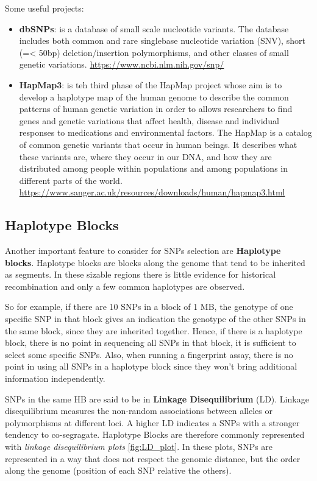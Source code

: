 \bigskip
Some useful projects:
\begin{itemize}
	\item \textbf{dbSNPs}: is a database of small scale nucleotide variants. The database includes both common and rare singlebase nucleotide variation (SNV), short (=< 50bp) deletion/insertion polymorphisms, and other classes of small genetic variations.
	\url{https://www.ncbi.nlm.nih.gov/snp/}
	
	\item \textbf{HapMap3}: is teh third phase of the HapMap project whose aim is to develop a haplotype map of the human genome to describe the common patterns of human genetic variation in order to allows researchers to find genes and genetic variations that affect health, disease and individual responses to medications and environmental factors. The HapMap is a catalog of common genetic variants that occur in human beings. It describes what these variants are, where they occur in our DNA, and how they are distributed among people within populations and among populations in different parts of the world.
	\url{https://www.sanger.ac.uk/resources/downloads/human/hapmap3.html}
\end{itemize}

\subsection*{Haplotype Blocks}

Another important feature to consider for SNPs selection are \textbf{Haplotype blocks}. Haplotype blocks are blocks along the genome that tend to be inherited as segments. In these sizable regions there is little evidence for historical recombination and only a few common haplotypes are observed. 

So for example, if there are 10 SNPs in a block of 1 MB, the genotype of one specific SNP in that block gives an indication the genotype of the other SNPs in the same block, since they are inherited together. 
Hence, if there is a haplotype block, there is no point in sequencing all SNPs in that block, it is sufficient to select some specific SNPs. Also, when running a fingerprint assay, there is no point in using all SNPs in a haplotype block since they won't bring additional information independently.

SNPs in the same HB are said to be in \textbf{Linkage Disequilibrium} (LD). Linkage disequilibrium measures the non-random associations between alleles or polymorphisms at different loci. A higher LD indicates a SNPs with a stronger tendency to co-segragate.
Haplotype Blocks are therefore commonly represented with \emph{linkage disequilibrium plots} \ref{fig:LD_plot}. In these plots, SNPs are represented in a way that does not respect the genomic distance, but the order along the genome (position of each SNP relative the others). 

